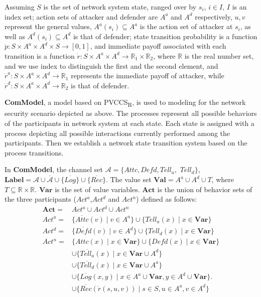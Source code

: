 \documentclass{acm_proc_article-sp}
\begin{document}
Assuming $S$ is the set of network system state, ranged over by $s_{\textit{i}}$, $i\in I$, $I$ is an index set; action sets of attacker and defender are $A^{a}$ and $A^{d}$ respectively, $u,v$ represent the general values,  $A^{a}(s_{\textit{i}})\subseteq A^{a}$ is the action set of attacker at $s_{\textit{i}}$, as well as $A^{d}(s_{\textit{i}})\subseteq A^{d}$ is that of defender; state transition probability is a function $\dot{p}:S\times A^{a}\times A^{d}\times S\rightarrow [0,1]$, and immediate payoff associated with each transition is a function $\dot{r}: S\times A^{a}\times A^{d}\rightarrow \mathds{R}_1\times \mathds{R}_2$, where $\mathds{R}$ is the real number set, and we use index to distinguish the first and the second element, and $\dot{r}^a: S\times A^{a}\times A^{d}\rightarrow \mathds{R}_{1}$ represents the immediate payoff of attacker, while $\dot{r}^d: S\times A^{a}\times A^{d}\rightarrow \mathds{R}_{2}$ is that of defender.

\textbf{ComModel}, a model based on PVCCS\textsubscript{R}, is used to modeling for the network security scenario depicted as above. The processes represent all possible behaviors of the participants in network system at each state. Each state is assigned with a process depicting all possible interactions currently performed among the participants. Then we establish a network state transition system based on the process transitions.

In \textbf{ComModel}, the channel set  $\mathcal{A}=\{Attc,\textit{Defd},Tell_a,$ $Tell_d\}$, $\mathbf{Label}=\mathcal{A}\cup \overline{\mathcal{A}}\cup \{\overline{Log}\}\cup \{\overline{Rec}\}$. The value set $\mathbf{Val}=A^a\cup A^d\cup T$, where $T \subseteq \mathds{R}\times\mathds{R}$. $\mathbf{Var}$ is the set of value variables.  $\mathbf{Act}$ is the union of behavior sets of the three participants ($Act^a$,$Act^d$ and $Act^n$) defined as follows:
\begin{equation*}
\begin{aligned}
\mathbf{Act}=&Act^a\cup Act^d\cup Act^n\\
Act^a=&\{\overline{Attc}(v)\mid v\in A^a \}\cup\{Tell_a(x)\mid x\in \mathbf{Var}\}\\
Act^d=&\{\overline{\textit{Defd}}(v)\mid v\in A^d \}\cup \{Tell_d(x)\mid x\in \mathbf{Var}\}\\
Act^n=&\{Attc(x)\mid x\in \mathbf{Var} \}\cup \{\textit{Defd}(x)\mid x\in \mathbf{Var} \}\\
&\cup \{\overline{Tell_a}(x)\mid x\in \mathbf{Var}\cup A^d \}\\
&\cup \{\overline{Tell_d}(x)\mid x\in \mathbf{Var}\cup A^a \}\\
&\cup \{\overline{Log}(x,y)\mid x\in A^a\cup \mathbf{Var}, y\in A^d\cup \mathbf{Var}\}.\\
&\cup \{\overline{Rec}(\dot{r}(s,u,v))\mid s\in S, u\in A^a, v\in A^d\}\\
\end{aligned}
\end{equation*}
\end{document}
